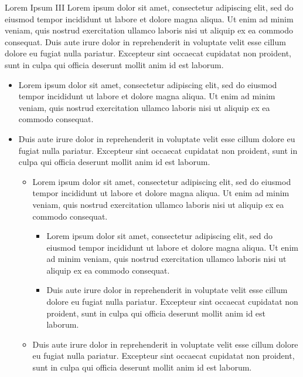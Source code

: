 \begin{titledbox}{Lorem Ipsum III}
    Lorem ipsum dolor sit amet, consectetur adipiscing elit, sed do eiusmod
    tempor incididunt ut labore et dolore magna aliqua. Ut enim ad minim veniam,
    quis nostrud exercitation ullamco laboris nisi ut aliquip ex ea commodo
    consequat. Duis aute irure dolor in reprehenderit in voluptate velit esse
    cillum dolore eu fugiat nulla pariatur. Excepteur sint occaecat cupidatat
    non proident, sunt in culpa qui officia deserunt mollit anim id est laborum.
    \begin{itemize}
        \item Lorem ipsum dolor sit amet, consectetur adipiscing elit, sed do
            eiusmod tempor incididunt ut labore et dolore magna aliqua. Ut enim
            ad minim veniam, quis nostrud exercitation ullamco laboris nisi ut
            aliquip ex ea commodo consequat.
        \item Duis aute irure dolor in reprehenderit in voluptate velit esse
            cillum dolore eu fugiat nulla pariatur. Excepteur sint occaecat
            cupidatat non proident, sunt in culpa qui officia deserunt mollit
            anim id est laborum.
            \begin{itemize}
                \item Lorem ipsum dolor sit amet, consectetur adipiscing elit,
                    sed do eiusmod tempor incididunt ut labore et dolore magna
                    aliqua. Ut enim ad minim veniam, quis nostrud exercitation
                    ullamco laboris nisi ut aliquip ex ea commodo consequat.
                    \begin{itemize}
                        \item Lorem ipsum dolor sit amet, consectetur adipiscing
                            elit, sed do eiusmod tempor incididunt ut labore et
                            dolore magna aliqua. Ut enim ad minim veniam, quis
                            nostrud exercitation ullamco laboris nisi ut aliquip
                            ex ea commodo consequat.
                        \item Duis aute irure dolor in reprehenderit in
                            voluptate velit esse cillum dolore eu fugiat nulla
                            pariatur. Excepteur sint occaecat cupidatat non
                            proident, sunt in culpa qui officia deserunt mollit
                            anim id est laborum.
                    \end{itemize}
                \item Duis aute irure dolor in reprehenderit in voluptate velit
                    esse cillum dolore eu fugiat nulla pariatur. Excepteur sint
                    occaecat cupidatat non proident, sunt in culpa qui officia
                    deserunt mollit anim id est laborum.
            \end{itemize}
    \end{itemize}
\end{titledbox}